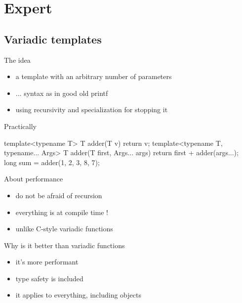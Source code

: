 \section[exp]{Expert \cpp}

\subsection[tmpl]{Variadic templates}


\begin{frame}[fragile]
  \begin{block}{The idea}
    \begin{itemize}
    \item a template with an arbitrary number of parameters
    \item ... syntax as in good old printf
    \item using recursivity and specialization for stopping it
    \end{itemize}
  \end{block}
  \begin{exampleblock}{Practically}
    \begin{cppcode*}{}
      template<typename T>
      T adder(T v) {
        return v;
      }
      template<typename T, typename... Args>
      T adder(T first, Args... args) {
        return first + adder(args...);
      }
      long sum = adder(1, 2, 3, 8, 7);
    \end{cppcode*}
  \end{exampleblock}
\end{frame}

\begin{frame}
  \begin{block}{About performance}
    \begin{itemize}
    \item do not be afraid of recursion
    \item everything is at compile time !
    \item unlike C-style variadic functions
    \end{itemize}
  \end{block}
  \begin{block}{Why is it better than variadic functions}
    \begin{itemize}
    \item it's more performant
    \item type safety is included
    \item it applies to everything, including objects
    \end{itemize}
  \end{block}
\end{frame}

